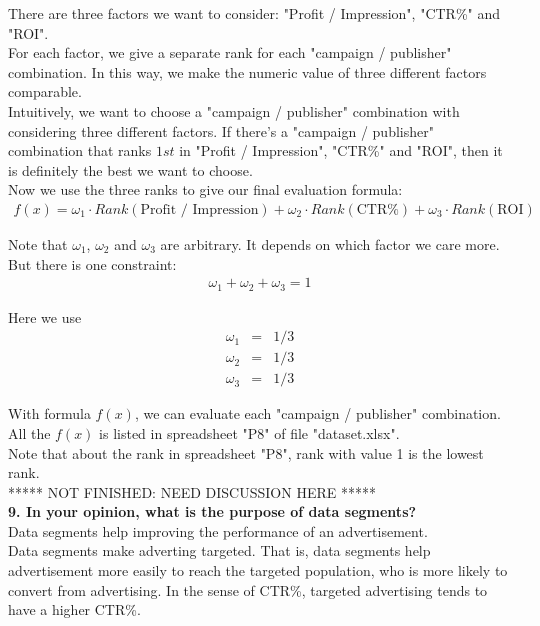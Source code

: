 \documentclass[12pt]{article}
\begin{document}
There are three factors we want to consider: "Profit / Impression", "CTR\%" and "ROI". \\

For each factor, we give a separate rank for each "campaign / publisher" combination. In this way, we make the numeric value of three different factors comparable. \\

Intuitively, we want to choose a "campaign / publisher" combination with considering three different factors. If there's a "campaign / publisher" combination that ranks $1st$ in "Profit / Impression", "CTR\%" and "ROI", then it is definitely the best we want to choose. \\

Now we use the three ranks to give our final evaluation formula:
\begin{eqnarray*}
f(x) = \omega_1 \cdot Rank(\text{Profit / Impression}) + \omega_2 \cdot Rank(\text{CTR\%}) + \omega_3 \cdot Rank(\text {ROI})
\end{eqnarray*}

Note that $\omega_1$, $\omega_2$ and $\omega_3$ are arbitrary. It depends on which factor we care more. But there is one constraint:
\begin{eqnarray*}
\omega_1 + \omega_2 + \omega_3 = 1
\end{eqnarray*}

Here we use
\begin{eqnarray*}
\omega_1 &=& 1/3 \\
\omega_2 &=& 1/3 \\
\omega_3 &=& 1/3 
\end{eqnarray*}

With formula $f(x)$, we can evaluate each "campaign / publisher" combination. All the $f(x)$ is listed in spreadsheet "P8" of file "dataset.xlsx". \\

Note that about the rank in spreadsheet "P8", rank with value 1 is the lowest rank. \\

***** NOT FINISHED: NEED DISCUSSION HERE ***** \\

{\bf 9. In your opinion, what is the purpose of data segments?} \\

Data segments help improving the performance of an advertisement. \\

Data segments make adverting targeted. That is, data segments help advertisement more easily to reach the targeted population, who is more likely to convert from advertising. In the sense of CTR\%, targeted advertising tends to have a higher CTR\%. \\
\end{document}
